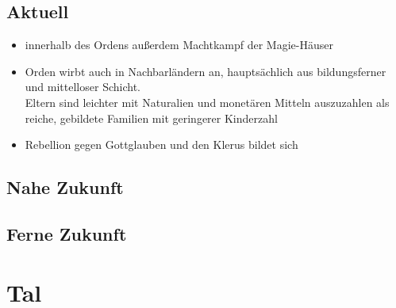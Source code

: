 \section{Aktuell}
\begin{itemize}
	\item innerhalb des Ordens außerdem Machtkampf der Magie-Häuser
	\item Orden wirbt auch in Nachbarländern an, hauptsächlich aus bildungsferner und mittelloser Schicht.\\
	Eltern sind leichter mit Naturalien und monetären Mitteln auszuzahlen als reiche, gebildete Familien mit geringerer Kinderzahl
	\item Rebellion gegen Gottglauben und den Klerus bildet sich
\end{itemize}

\section{Nahe Zukunft}

\section{Ferne Zukunft}

\chapter{Tal}